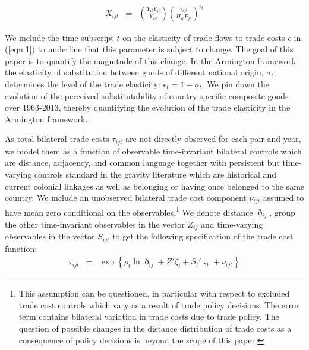 \documentclass[12pt,twoside,a4paper,notitlepage]{article}
\begin{document}
\begin{eqnarray}
X_{ijt} & = & \left(\frac{Y_{it}Y_{jt}}{Y_{wt}}\right)\left(\frac{\tau_{ijt}}{\Pi_{it}P_{jt}}\right)^{\epsilon_t}\label{eqn:1}
\end{eqnarray}

We include the time subscript $t$ on the elasticity of trade flows to trade costs $\epsilon$ in (\ref{eqn:1}) to underline that this parameter is subject to change. 
The goal of this paper is to quantify the magnitude of this change. 
In the Armington framework the elasticity of substitution between goods of different national origin, $\sigma_t$, determines the level of the trade elasticity: $\epsilon_t=1-\sigma_t$.
We pin down the evolution of the perceived substitutability of country-specific composite goods over 1963-2013, thereby quantifying the evolution of the trade elasticity in the Armington framework.

As total bilateral trade costs $\tau_{ijt}$ are not directly observed for each pair and year, we model them as a function of observable time-invariant bilateral controls which are distance, adjacency, and common language together with persistent but time-varying controls standard in the gravity literature which are historical and current colonial linkages as well as belonging or having once belonged to the same country.
We include an unobserved bilateral trade cost component $\nu_{ijt}$ assumed to have mean zero conditional on the observables.\footnote{ This assumption can be questioned, in particular with respect to excluded trade cost controls which vary as a result of trade policy decisions.
	\fi The error term contains bilateral variation in trade costs due to trade policy.
	The question of possible changes in the distance distribution of trade costs as a consequence of policy decisions is beyond the scope of this paper.}
We denote distance $\eth_{ij}$, group the other time-invariant observables in the vector $Z_{ij}$ and time-varying observables in the vector $S_{ijt}$ to get the following specification of the trade cost function:
\begin{eqnarray}
\tau_{ijt}&=&\exp\left\{\rho_t\ln{\eth_{ij}}+{Z}'\zeta_{t}+{S_t}'\varsigma_{t}+\nu_{ijt}\right\} \label{eqn:20}
\end{eqnarray}
\end{document}
